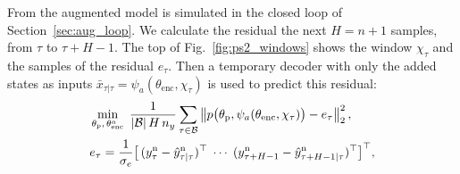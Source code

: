 From  the augmented model is simulated in the closed loop of 
Section~\ref{sec:aug_loop}.
We calculate the residual  the next $H=n+1$ samples, from $\tau$ to $\tau+H-1$.
The top of Fig.~\ref{fig:ps2_windows} shows the window $\chi_\tau$ and the
samples of the residual $e_\tau$.
%
Then a temporary decoder  with only the added states as inputs
$\bar x_{\tau|\tau}=\psi_a(\theta_{\mathrm{enc}},\chi_\tau)$
is used to predict this residual:
\begin{equation}
\begin{aligned}
 &\min_{\theta_{\mathrm p},\,\theta^a_{\mathrm{enc}}}\;
 \frac{1}{|\mathcal B|\,H\,n_y}\sum_{\tau\in\mathcal B}
 \left\lVert p\bigl(\theta_{\mathrm p},\psi_a(\theta_{\mathrm{enc}},\chi_\tau)\bigr)-e_\tau\right\rVert_2^2,\\
 &e_\tau=\frac{1}{\sigma_e}\bigl[\,(y^{\mathrm n}_{\tau}-\hat y^{\mathrm n}_{\tau|\tau})^\top\;\cdots\;
  (y^{\mathrm n}_{\tau+H-1}-\hat y^{\mathrm n}_{\tau+H-1|\tau})^\top\bigr]^\top,
\end{aligned}
\label{eq:ps2_s1}
\end{equation}
%
